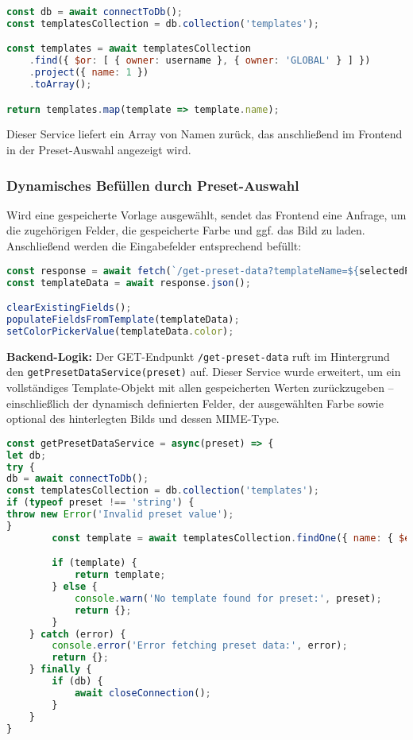 \begin{lstlisting}[language=JavaScript, caption=Service zum Abrufen von Template-Namen]
const db = await connectToDb();
const templatesCollection = db.collection('templates');

const templates = await templatesCollection
    .find({ $or: [ { owner: username }, { owner: 'GLOBAL' } ] })
    .project({ name: 1 })
    .toArray();

return templates.map(template => template.name);
\end{lstlisting}

Dieser Service liefert ein Array von Namen zurück, das anschließend im Frontend in der Preset-Auswahl angezeigt wird.

\subsubsection{Dynamisches Befüllen durch Preset-Auswahl}\label{subsubsec:load-template-data}

Wird eine gespeicherte Vorlage ausgewählt, sendet das Frontend eine Anfrage, um die zugehörigen Felder, die gespeicherte Farbe und ggf. das Bild zu laden.
Anschließend werden die Eingabefelder entsprechend befüllt:

\begin{lstlisting}[language=JavaScript, caption=Preset-Auswahl lädt Felder und Bild]
const response = await fetch(`/get-preset-data?templateName=${selectedPreset}`);
const templateData = await response.json();

clearExistingFields();
populateFieldsFromTemplate(templateData);
setColorPickerValue(templateData.color);
\end{lstlisting}

\textbf{Backend-Logik:} Der GET-Endpunkt \texttt{/get-preset-data} ruft im Hintergrund den \texttt{getPresetDataService(preset)} auf.
Dieser Service wurde erweitert, um ein vollständiges Template-Objekt mit allen gespeicherten Werten zurückzugeben – einschließlich der dynamisch definierten Felder, der ausgewählten Farbe sowie optional des hinterlegten Bilds und dessen MIME-Type.

\begin{lstlisting}[language=JavaScript, caption=Service zum Laden eines Templates]
const getPresetDataService = async(preset) => {
let db;
try {
db = await connectToDb();
const templatesCollection = db.collection('templates');
if (typeof preset !== 'string') {
throw new Error('Invalid preset value');
}
        const template = await templatesCollection.findOne({ name: { $eq: preset } });

        if (template) {
            return template;
        } else {
            console.warn('No template found for preset:', preset);
            return {};
        }
    } catch (error) {
        console.error('Error fetching preset data:', error);
        return {};
    } finally {
        if (db) {
            await closeConnection();
        }
    }
}
\end{lstlisting}

